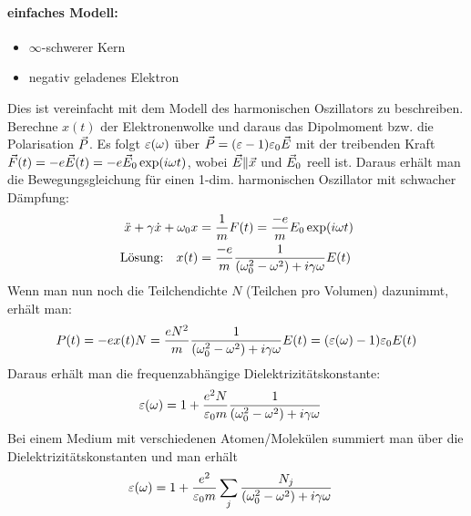 \paragraph{einfaches Modell:}
\begin{itemize}
	\item$\infty$-schwerer Kern
	\item negativ geladenes Elektron
\end{itemize}
Dies ist vereinfacht mit dem Modell des harmonischen Oszillators zu
beschreiben. Berechne $x(t)$ der Elektronenwolke und daraus das
Dipolmoment bzw. die Polarisation $\vec{P}$. Es folgt $\varepsilon(\omega)$
über $\vec{P}=(\varepsilon-1)\varepsilon_0 \vec{E}$ mit der treibenden Kraft
$\vec{F}(t)=-e\vec{E}(t)=-e\vec{E}_0 \exp(i\omega t)$, wobei $\vec{E}\|\vec{x}$
und $\vec{E}_0$ reell ist. 
Daraus erhält man die Bewegungsgleichung für einen 1-dim. harmonischen
Oszillator mit schwacher Dämpfung:
\begin{align*}
  \ddot{x}+\gamma\dot{x}+\omega_0 x
  &=\frac{1}{m} F(t)
    =\frac{-e}{m}E_0\exp(i\omega t)\\
  \text{Lösung:}\quad 
  x(t)
  &=\frac{-e}{m}\frac{1}{(\omega_0^2-\omega^2)+i\gamma\omega}E(t)
\end{align*}
Wenn man nun noch die Teilchendichte $N$ (Teilchen pro Volumen)
dazunimmt, erhält man:
\begin{align*}
	P(t) &= -ex(t)N
           = \frac{eN^2}{m} 
           \frac{1}{(\omega_0^2-\omega^2) + i\gamma\omega} E(t)
           =(\varepsilon(\omega)-1)\varepsilon_0 E(t)\\
\end{align*}
Daraus erhält man die frequenzabhängige Dielektrizitätskonstante: 
\begin{align*}
	 \varepsilon(\omega) &= 1 + \frac{e^2N}{\varepsilon_0 m}
                    \frac{1}{(\omega_0^2 - \omega^2) + i\gamma\omega}
\end{align*}
Bei einem Medium mit verschiedenen Atomen/Molekülen summiert man über
die Dielektrizitätskonstanten und man erhält
\begin{align*}
	 \varepsilon(\omega) &= 1 + \frac{e^2}{\varepsilon_0 m}
                    \sum_{j} \frac{N_j}{(\omega_0^2-\omega^2)+i\gamma\omega}
\end{align*}

